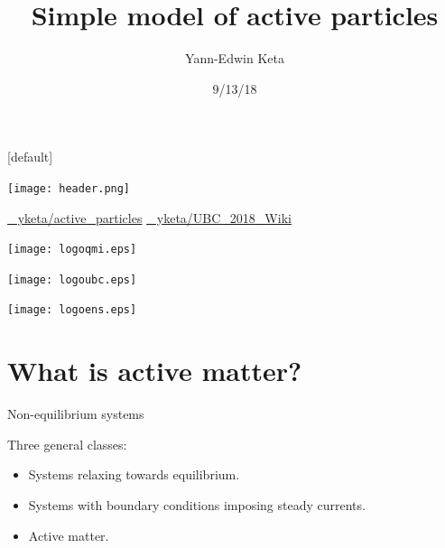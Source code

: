 \documentclass{beamer}
\title{Simple model of active particles}
\author{Yann-Edwin Keta}
\date{9/13/18}
\begin{document}
{
\makeatletter
    [default]
    \def\beamer@entrycode{\vspace*{-\headheight}}
\begin{frame}

\vspace*{-4mm}
{
 \hspace*{-\beamerleftmargin}%
\begin{minipage}{\paperwidth}
\texttt{[image: header.png]}
\end{minipage}
}

\titlepage

\begin{center}
\begin{minipage}{0.8\linewidth}
\href{https://github.com/yketa/active_particles}{{\footnotesize \faGithub~ yketa/active\_particles}}
\hfill\href{https://github.com/yketa/UBC_2018_Wiki}{{\footnotesize \faGithub~ yketa/UBC\_2018\_Wiki}}
\end{minipage}
\end{center}

\begin{minipage}{0.35\linewidth}
\texttt{[image: logoqmi.eps]}\hfill
\end{minipage}
\hfill
\begin{minipage}{0.36\linewidth}
\texttt{[image: logoubc.eps]}
\end{minipage}
\hfill
\begin{minipage}{0.19\linewidth}
\hfill\texttt{[image: logoens.eps]}
\end{minipage}

\end{frame}
}

\section{What is active matter?}

\begin{frame}{Non-equilibrium systems}

Three general classes:
\begin{itemize}[<+->]
  \item Systems relaxing towards equilibrium.
  \item Systems with boundary conditions imposing steady currents.
  \item Active matter.
\end{itemize}


\end{frame}
\end{document}
